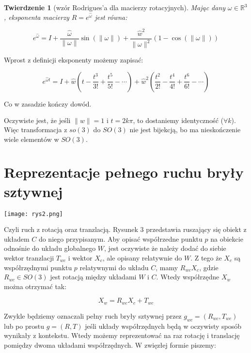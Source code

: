 \documentclass[a4paper,12pt]{article}
\newtheorem{theo}[defi]{Twierdzenie}
\newcommand{\RR}{\mathbb{R}^3}
\begin{document}
\begin{theo}[wzór Rodrigues'a dla macierzy rotacyjnych]
Mając dany $\omega \in \RR$, eksponenta macierzy $R = e^{\hat{\omega}}$ jest równa:
\end{theo}

\begin{equation}
e^{\hat{\omega}}=I + \frac{\hat{\omega}}{\| \omega \|}\sin(\| \omega \|) + \frac{\hat{w}^2}{\| \omega \|^2}(1 - \cos(\| \omega \|))
\end{equation}

\noindent Wprost z definicji eksponenty możemy zapisać:

\begin{equation}
e^{\hat{\omega}t}= I + \hat{w}(t - \frac{t^3}{3!} + \frac{t^5}{5!} - \cdots) + \hat{w}^2(\frac{t^2}{2!} - \frac{t^4}{4!} + \frac{t^6}{6!} - \cdots)
\end{equation}

\noindent Co w zasadzie kończy dowód.

Oczywiste jest, że jeśli $\| w \|=1$ i $t=2k\pi$, to dostaniemy identyczność ($\forall k$). Więc transformacja z $so(3)$ do $SO(3)$ nie jest bijekcją, bo ma nieskończenie wiele elementów w $SO(3)$.


\section{Reprezentacje pełnego ruchu bryły sztywnej}

\begin{center}
\texttt{[image: rys2.png]}
\end{center}

Czyli ruch z rotacją oraz tranzlacją. Rysunek 3 przedstawia ruszający się obiekt z układem $C$ do niego przypisanym. Aby opisać współrzedne punktu $p$ na obiekcie odnośnie do układu globalnego $W$, jest oczywiste że należy dodać do siebie wektor tranzlacji $T_{wc}$ i wektor $X_c$, ale opisany relatywnie do $W$. Z tego że $X_c$ są współrzędnymi punktu $p$ relatywnymi do układu $C$, mamy $R_{wc}X_c$, gdzie $R_{wc} \in SO(3)$ jest rotacją między układami $W$ i $C$. Wtedy współrzędne $X_w$ można otrzymać tak:

\begin{equation}
X_w = R_{wc}X_c + T_{wc}
\end{equation}

Zwykle będziemy oznaczali pełny ruch bryły sztywnej przez $g_{wc} = (R_{wc},T_{wc})$ lub po prostu $g = (R,T)$ jeśli układy współrzędnych będą w oczywisty sposób wynikały z kontekstu. Wtedy możemy reprezentować na raz rotację i translację pomiędzy dwoma układami współrzędnych. W zwięzłej formie piszemy:
\end{document}
